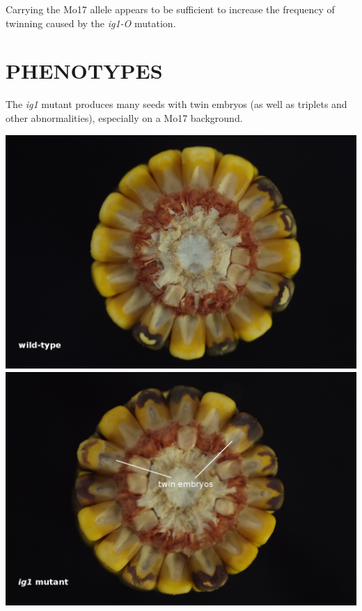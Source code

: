 \documentclass[maize,portrait]{a0poster}
\newlength{\figwidth}
\begin{document}
\begin{multicols}{3}
  Carrying the Mo17 allele appears to be sufficient to increase the frequency of twinning caused by the \textit{ig1-O} mutation.

  \section*{PHENOTYPES}

  The \textit{ig1} mutant produces many seeds with twin embryos (as well as triplets and other abnormalities), especially on a Mo17 background.

  \begin{center}
    \begin{minipage}[t]{1.0\linewidth}
      \includegraphics[width=0.5\figwidth]{Tang-ear-wt-end}
      \includegraphics[width=0.5\figwidth]{Tang-ear-ig1-end}
    \end{minipage}
    \begin{minipage}[t]{1.0\linewidth}

\end{minipage}
\end{center}
\end{multicols}
\end{document}
